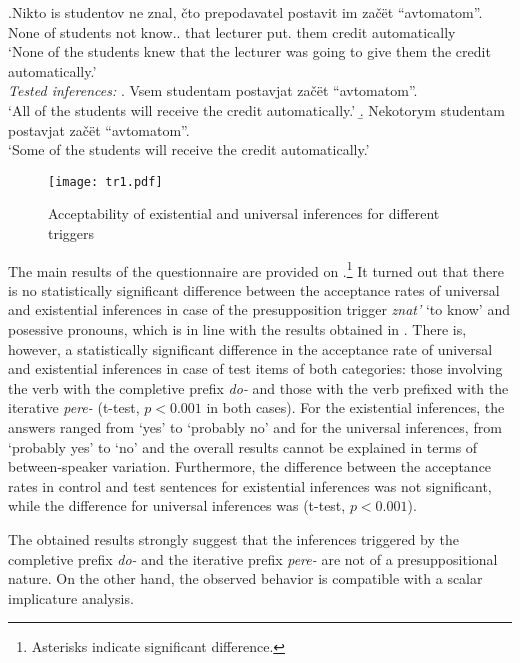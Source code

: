 \exg.\label{ex:znat}Nikto is studentov ne znal, \v{c}to prepodavatel postavit im za\v{c}\"{e}t ``avtomatom''.\\
None of students not know.. that lecturer put. them credit automatically\\
\vspace{0.5em}
`None of the students knew that the lecturer was going to give them the credit automatically.'\\
\textit{Tested inferences:}
\a. Vsem studentam postavjat za\v{c}\"et ``avtomatom''.\\
`All of the students will receive the credit automatically.'
\b. Nekotorym studentam postavjat za\v{c}\"et ``avtomatom''.\\
`Some of the students will receive the credit automatically.'

\begin{figure}
\texttt{[image: tr1.pdf]}
\caption{Acceptability of existential and universal inferences for different triggers}
\label{fig:results}
\end{figure}

The main results of the questionnaire are provided on .\footnote{Asterisks indicate significant difference.} It turned out that there is no statistically significant difference between the acceptance rates of universal and existential inferences in case of the presupposition trigger \textit{znat'} `to know' and posessive pronouns, which is in line with the results obtained in \citealt{Chemla:09}. There is, however, a statistically significant difference in the acceptance rate of universal and existential inferences in case of test items of both categories: those involving the verb with the completive prefix \textit{do-} and those with the verb prefixed with the iterative \textit{pere-} (t-test, $p<0.001$ in both cases). For the existential inferences, the answers ranged from `yes' to `probably no' and for the universal inferences, from `probably yes' to `no' and the overall results cannot be explained in terms of between-speaker variation. Furthermore, the difference between the acceptance rates in control and
test sentences for existential inferences was not significant, while the
difference for universal inferences was (t-test, $p<0.001$).

The obtained results strongly suggest that the inferences triggered by the completive prefix \textit{do-} and the iterative prefix \textit{pere-} are not of a presuppositional nature. On the other hand, the observed behavior is compatible with a scalar implicature analysis.
